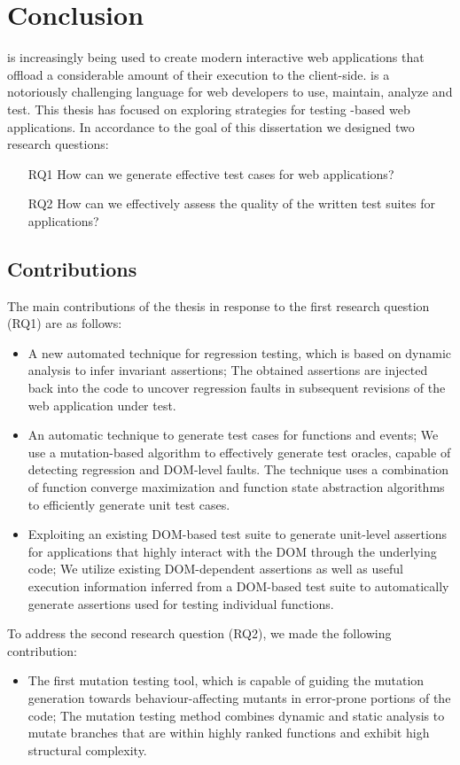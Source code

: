 \chapter{Conclusion} \label{Chap:conc}
\javascript is increasingly being used to create modern interactive web applications that offload a considerable amount of their execution to the client-side. \javascript is a notoriously challenging language for web developers to use, maintain, analyze and test. This thesis has focused on exploring strategies for testing \javascript-based web applications. In accordance to the goal of this dissertation we designed two research questions:
\begin{itemize}
\item [RQ1] How can we generate effective test cases for \javascript web applications?
\item [RQ2] How can we effectively assess the quality of the written test suites for \javascript applications?
\end{itemize}
\section{Contributions}
The main contributions of the thesis in response to the first research question (RQ1) are as follows: 
\begin{itemize}
\item A new automated technique for \javascript regression testing, which is based on dynamic analysis to infer invariant assertions; The obtained assertions are injected back into the \javascript code to uncover regression faults in subsequent revisions of the web application under test. 
\item An automatic technique to generate test cases for \javascript functions and events; We use a mutation-based algorithm to effectively generate test oracles, capable of detecting regression \javascript and DOM-level faults. The technique uses a combination of function converge maximization and function state abstraction algorithms to efficiently generate unit test cases.
\item Exploiting an existing DOM-based test suite to generate unit-level assertions for applications that highly interact with the DOM through the underlying \javascript code; We utilize
existing DOM-dependent assertions as well as useful execution information inferred from a DOM-based test suite to automatically generate assertions used for testing individual \javascript functions.
\end{itemize}
To address the second research question (RQ2), we made the following contribution:
\begin{itemize}
\item The first \javascript mutation testing tool, which is capable of guiding the mutation generation towards behaviour-affecting mutants in error-prone portions of the code; The mutation testing method combines dynamic and static analysis to mutate branches that are within highly ranked functions and exhibit high structural complexity.
\end{itemize}